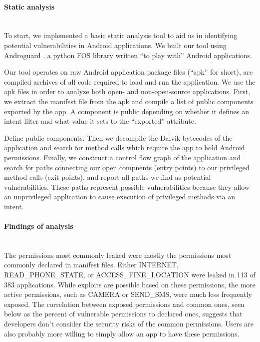 \documentclass[12pt,a4paper]{article} \usepackage{verbatim}
\begin{document}
\paragraph{Static analysis} ~\\

To start, we implemented a basic static analysis tool to aid us in identifying
potential vulnerabilities in Android applications. We built our tool using
Androguard \cite{androguard}, a python FOS library written ``to play with''
Android applications.

Our tool operates on raw Android application package files (``apk'' for short),
are compiled archives of all code required to load and run the application. We
use the apk files in order to analyze both open- and non-open-source
applications. First, we extract the manifest file from the apk and compile a
list of public components exported by the app. A component is public depending
on whether it defines an intent filter and what value it sets to the
``exported'' attribute.

Define public components. Then we decompile the
Dalvik bytecodes of the application and search for method calls which require
the app to hold Android permissions. Finally, we construct a control flow graph
of the application and search for paths connecting our open compnents (entry
points) to our privileged method calls (exit points), and report all paths we
find as potential vulnerabilities. These paths represent possible
vulnerabilities because they allow an unprivileged application to cause
execution of privileged methods via an intent.

\paragraph{Findings of analysis} ~\\

The permissions most commonly leaked were mostly the permissions most commonly
declared in manifest files. Either INTERNET, READ\_PHONE\_STATE, or
ACCESS\_FINE\_LOCATION were leaked in 113 of 383 applications. While exploits
are possible based on these permissions, the more active permissions, such as
CAMERA or SEND\_SMS, were much less frequently exposed. The correlation between
exposed permissions and common ones, seen below as the percent of vulnerable
permissions to declared ones, suggests that developers don't consider the
security risks of the common permissions. Users are also probably more willing
to simply allow an app to have these permissions.
\end{document}
